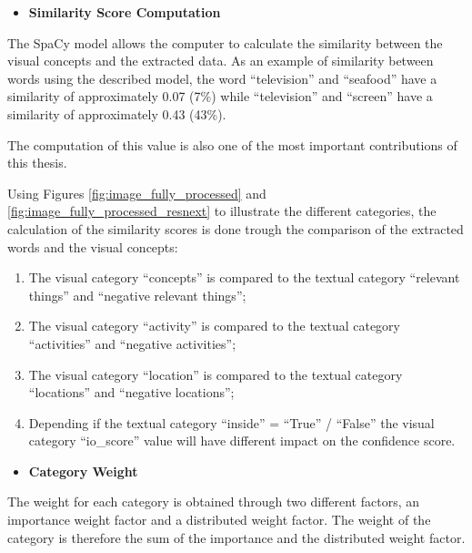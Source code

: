     

    \begin{itemize}
      \item \textbf{Similarity Score Computation}
    \end{itemize}

    The SpaCy model allows the computer to calculate the similarity between the visual concepts and the extracted data. As an example of similarity between words using the described model, the word \enquote{television} and \enquote{seafood} have a similarity of approximately 0.07 (7\%) while \enquote{television} and \enquote{screen} have a similarity of approximately 0.43 (43\%).
    
    The computation of this value is also one of the most important contributions of this thesis.
      
    Using Figures \ref{fig:image_fully_processed} and \ref{fig:image_fully_processed_resnext} to illustrate the different categories, the calculation of the similarity scores is done trough the comparison of the extracted words and the visual concepts:
    \begin{enumerate}
        \itemsep0em
        \item The visual category \enquote{concepts} is compared to the textual category \enquote{relevant things} and \enquote{negative relevant things};
        \item The visual category \enquote{activity} is compared to the textual category \enquote{activities} and \enquote{negative activities};
        \item The visual category \enquote{location} is compared to the textual category \enquote{locations} and \enquote{negative locations};
        \item Depending if the textual category \enquote{inside} = \enquote{True} / \enquote{False} the visual category \enquote{io\_score} value will have different impact on the confidence score.
    \end{enumerate}

    \begin{itemize}
      \item \textbf{Category Weight}
    \end{itemize}


    The weight for each category is obtained through two different factors, an importance weight factor and a distributed weight factor. The weight of the category is therefore the sum of the importance and the distributed weight factor. 

